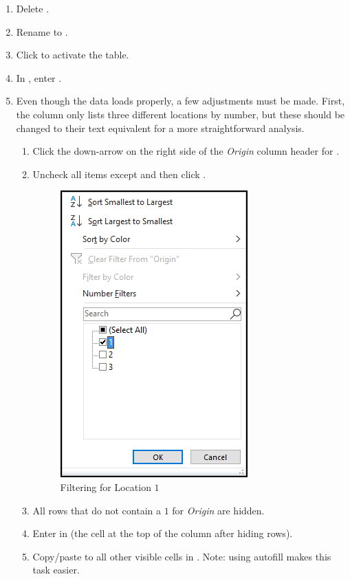 \begin{enumbox}
\begin{enumerate}
		\item Delete .
		\item Rename  to .
		\item Click  to activate the table.
		\item In , enter .

		\item Even though the data loads properly, a few adjustments must be made. First, the  column only lists three different locations by number, but these should be changed to their text equivalent for a more straightforward analysis.
		
		\begin{enumerate}
			\item Click the down-arrow on the right side of the \textit{Origin} column header for .
			\item Uncheck all items except  and then click .
	
			\begin{figure}[H]
				\centering
				\includegraphics[width=\maxwidth{.60\linewidth}]{gfx/ch09_fig70}
				\caption{Filtering for Location $ 1 $}
				\label{09:fig70}
			\end{figure}
	
			\item All rows that do not contain a $ 1 $ for \textit{Origin} are hidden. 
			\item Enter  in  (the cell at the top of the column after hiding rows).
			\item Copy/paste  to all other visible cells in .	Note: using autofill makes this task easier.
			

\end{enumerate}
\end{enumerate}
\end{enumbox}

